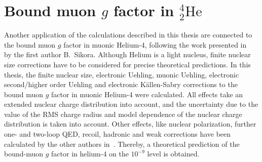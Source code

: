 %
%
% 

\cleardoublepage

\section{Bound muon $g$ factor in $^4_2\text{He}$}
\label{sec:muon_he}

Another application of the calculations described in this thesis are connected to the bound muon $g$ factor in muonic Helium-4, following the work presented in~\cite{sikora2018} by the first author B.~Sikora. Although Helium is a light nucleus, finite nuclear size corrections have to be considered for precise theoretical predictions. In this thesis, the finite nuclear size, electronic Uehling, muonic Uehling, electronic second/higher order Uehling and electronic Källen-Sabry corrections to the bound muon $g$ factor in muonic Helium-4 were calculated. All effects take an extended nuclear charge distribution into account, and the uncertainty due to the value of the RMS charge radius and model dependence of the nuclear charge distribution is taken into account.
Other effects, like nuclear polarization, further one- and two-loop QED, recoil, hadronic and weak corrections have been calculated by the other authors in~\cite{sikora2018}. Thereby, a theoretical prediction of the bound-muon $g$ factor in helium-4 on the $10^{-9}$ level is obtained.

